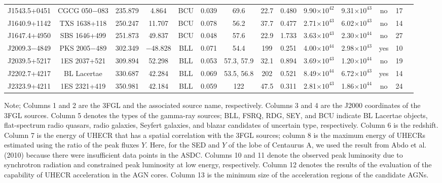 \documentclass{aastex6}
\begin{document}
\begin{table}
{\begin{tabular}{cccccccccccccc}
%
J1543.5+0451 & CGCG 050$-$083 & 235.879 & 4.864 & BCU & 0.039 & 69.6 & 22.7 & 0.480 & 9.90$\times10^{42}$ & 9.31$\times10^{43}$ & no & 17 \\
%
J1640.9+1142 & TXS 1638+118 & 250.247 & 11.707 & BCU & 0.078 & 56.2 & 37.7 & 0.477 & 2.71$\times10^{43}$ & 6.02$\times10^{43}$ & no & 14 \\
%
J1647.4+4950 & SBS 1646+499 & 251.873 & 49.837 & BCU & 0.048 & 57.6 & 22.9 & 1.733 & 3.63$\times10^{43}$ & 2.30$\times10^{44}$ & no& 27 \\
%
J2009.3$-$4849 & PKS 2005$-$489 & 302.349 & $-$48.828 & BLL & 0.071 & 54.4 & 199 & 0.251 & 4.00$\times10^{44}$ & 2.98$\times10^{43}$ & yes & 10 \\
%
J2039.5+5217 & 1ES 2037+521 & 309.894 & 52.298 & BLL & 0.053 & 57.3, 57.9 & 32.1 & 0.894 & 3.69$\times10^{43}$ & 1.20$\times10^{44}$ & no & 19 \\ 
%
J2202.7+4217 & BL Lacertae & 330.687 & 42.284 & BLL & 0.069 & 53.5, 56.8 & 202 & 0.521 & 8.49$\times10^{44}$ & 6.72$\times10^{43}$ & yes & 14 \\
%
J2323.9+4211 & 1ES 2321+419 & 350.981 & 42.184 & BLL & 0.059 & 122 & 47.5 & 0.311 & 2.81$\times10^{43}$ & 1.86$\times10^{44}$ & no & 24 \\
\hline
\end{tabular}
}
\end{table}
Note; Columns 1 and 2 are the 3FGL and the associated source name, respectively. Columns 3 and 4 are the J2000 coordinates of the 3FGL sources. Column 5 denotes the types of the gamma-ray sources; BLL, FSRQ, RDG, SEY, and BCU indicate BL Lacertae objects, flat-spectrum radio quasars, radio galaxies, Seyfert galaxies, and blazar candidates of uncertain type, respectively. Column 6 is the redshift. Column 7 is the energy of UHECR that has a spatial correlation with the 3FGL sources; column 8 is the maximum energy of UHECRs estimated using the ratio of the peak fluxes $Y$. Here, for the SED and $Y$ of the lobe of Centaurus A, we used the result from Abdo et al. (2010) because there were insufficient data points in the ASDC. Columns 10 and 11 denote the observed peak luminosity due to synchrotron radiation and constrained peak luminosity at low energy, respectively. Column 12 denotes the results of the evaluation of the capability of UHECR acceleration in the AGN cores. Column 13 is the minimum size of the acceleration regions of the candidate AGNs.
\clearpage
\end{document}
